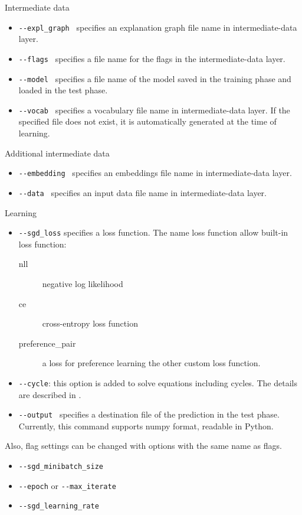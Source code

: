 \documentclass[a4paper]{report}
\begin{document}
Intermediate data
\begin{itemize}
	\item \verb|--expl_graph | specifies an explanation graph file name in intermediate-data layer.	
	\item \verb|--flags | specifies a file name for the flags in the intermediate-data layer.	
	\item \verb|--model | specifies a file name of the model saved in the training phase and loaded in the test phase.
	\item \verb|--vocab | specifies a vocabulary file name in intermediate-data layer.
	If the specified file does not exist, it is automatically generated at the time of learning.
\end{itemize}

Additional intermediate data
\begin{itemize}
	\item \verb|--embedding | specifies an embeddings file name in intermediate-data layer.
	\item \verb|--data | specifies an input data file name in intermediate-data layer.	
\end{itemize}

Learning
\begin{itemize}
	\item \verb|--sgd_loss| specifies a loss function. The name loss function allow built-in loss function: 
	\begin{description}
		\item [nll] negative log likelihood
		\item [ce] cross-entropy loss function
		\item [preference\_pair] a loss for preference learning
		the other custom loss function.
	\end{description}
	\item \verb|--cycle|: this option is added to solve equations including cycles. The details are described in .
	\item \verb|--output | specifies a destination file of the prediction in the test phase. Currently, this command supports  numpy format, readable in Python.
\end{itemize}

Also, flag settings can be changed with options with the same name as flags.
\begin{itemize}
	\item \verb|--sgd_minibatch_size| 
	\item \verb|--epoch| or \verb|--max_iterate|
	\item \verb|--sgd_learning_rate|
\end{itemize}
\end{document}
